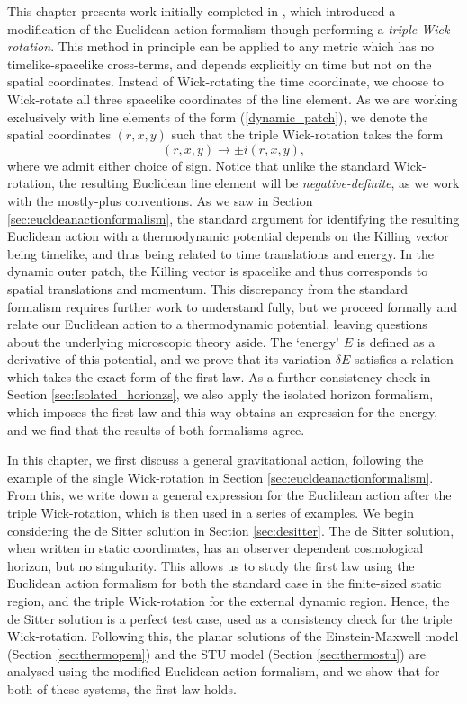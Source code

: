 This chapter presents work initially completed in \cite{Gutowski:2020fzb}, which introduced a modification of the Euclidean action formalism though performing a \emph{triple Wick-rotation}. This method in principle can be applied to any metric which has no timelike-spacelike cross-terms, and depends explicitly on time but not on the spatial coordinates. Instead of Wick-rotating the time coordinate, we choose to Wick-rotate all three spacelike coordinates of the line element. As we are working exclusively with line elements of the form (\ref{dynamic_patch}), we denote the spatial coordinates $(r,x,y)$ such that the triple Wick-rotation takes the form
\begin{equation}
\label{eq:triplewick}
    (r,x,y) \rightarrow \pm i (r,x,y) ,
\end{equation}
where we admit either choice of sign. Notice that unlike the standard Wick-rotation, the resulting Euclidean line element will be \emph{negative-definite}, as we work with the mostly-plus conventions. As we saw in Section \ref{sec:eucldeanactionformalism}, the standard argument for identifying the resulting Euclidean action with a thermodynamic potential depends on the Killing vector being timelike, and thus being related to time translations and energy. In the dynamic outer patch, the Killing vector is spacelike and thus corresponds to spatial translations and momentum. This discrepancy from the standard formalism requires further work to understand fully, but we proceed formally and relate our Euclidean action to a thermodynamic potential, leaving questions about the underlying microscopic theory aside. The `energy' $E$ is defined as a derivative of this potential, and we prove that its variation $\delta E$ satisfies a relation which takes the exact form of the first law. As a further consistency check in Section \ref{sec:Isolated_horionzs}, we also apply the isolated horizon formalism, which imposes the first law and this way obtains an expression for the energy, and we find that the results of both formalisms agree.

In this chapter, we first discuss a general gravitational action, following the example of the single Wick-rotation in Section \ref{sec:eucldeanactionformalism}. From this, we write down a general expression for the Euclidean action after the triple Wick-rotation, which is then used in a series of examples. We begin considering the de Sitter solution in Section \ref{sec:desitter}. The de Sitter solution, when written in static coordinates, has an observer dependent cosmological horizon, but no singularity. This allows us to study the first law using the Euclidean action formalism for both the standard case in the finite-sized static region, and the triple Wick-rotation for the external dynamic region. Hence, the de Sitter solution is a perfect test case, used as a consistency check for the triple Wick-rotation. Following this, the planar solutions of the Einstein-Maxwell model (Section \ref{sec:thermopem}) and the STU model (Section \ref{sec:thermostu}) are analysed using the modified Euclidean action formalism, and we show that for both of these systems, the first law holds.


